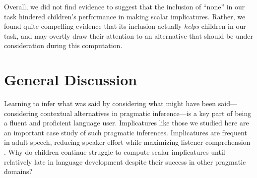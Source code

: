 \documentclass[man]{apa2}
\begin{document}
{Overall, we did not find evidence to suggest that the inclusion of ``none'' in our task hindered children's performance in making scalar implicatures. Rather, we found quite compelling evidence that its inclusion actually \emph{helps} children in our task, and may overtly draw their attention to an alternative that should be under consideration during this computation.

\section{General Discussion}


Learning to infer what was said by considering what might have been said---considering contextual alternatives in pragmatic inference---is a key part of being a fluent and proficient language user. Implicatures like those we studied here are an important case study of such pragmatic inferences. Implicatures are frequent in adult speech, reducing speaker effort while maximizing listener comprehension \cite{grice1975,horn1984}. Why do children continue struggle to compute scalar implicatures until relatively late in language development despite their success in other pragmatic domains?

}
\end{document}
